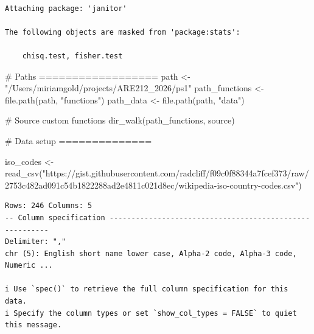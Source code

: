 \documentclass[
  letterpaper,
  DIV=11,
  numbers=noendperiod]{scrartcl}
\newenvironment{Shaded}{\begin{snugshade}}{\end{snugshade}}
\newcommand{\CommentTok}[1]{\textcolor[rgb]{0.37,0.37,0.37}{#1}}
\newcommand{\FunctionTok}[1]{\textcolor[rgb]{0.28,0.35,0.67}{#1}}
\newcommand{\NormalTok}[1]{\textcolor[rgb]{0.00,0.23,0.31}{#1}}
\newcommand{\OtherTok}[1]{\textcolor[rgb]{0.00,0.23,0.31}{#1}}
\newcommand{\StringTok}[1]{\textcolor[rgb]{0.13,0.47,0.30}{#1}}
\begin{document}
\begin{verbatim}

Attaching package: 'janitor'

The following objects are masked from 'package:stats':

    chisq.test, fisher.test
\end{verbatim}

\begin{Shaded}
\begin{Highlighting}[]
\CommentTok{\# Paths ==================}
\NormalTok{path }\OtherTok{\textless{}{-}} \StringTok{"/Users/miriamgold/projects/ARE212\_2026/ps1"}
\NormalTok{path\_functions }\OtherTok{\textless{}{-}} \FunctionTok{file.path}\NormalTok{(path, }\StringTok{"functions"}\NormalTok{)}
\NormalTok{path\_data }\OtherTok{\textless{}{-}} \FunctionTok{file.path}\NormalTok{(path, }\StringTok{"data"}\NormalTok{)}

\CommentTok{\# Source custom functions }
\FunctionTok{dir\_walk}\NormalTok{(path\_functions, source)}

\CommentTok{\# Data setup ==============}

\NormalTok{iso\_codes }\OtherTok{\textless{}{-}} 
  \FunctionTok{read\_csv}\NormalTok{(}\StringTok{"https://gist.githubusercontent.com/radcliff/f09c0f88344a7fcef373/raw/2753c482ad091c54b1822288ad2e4811c021d8ec/wikipedia{-}iso{-}country{-}codes.csv"}\NormalTok{)}
\end{Highlighting}
\end{Shaded}

\begin{verbatim}
Rows: 246 Columns: 5
-- Column specification --------------------------------------------------------
Delimiter: ","
chr (5): English short name lower case, Alpha-2 code, Alpha-3 code, Numeric ...

i Use `spec()` to retrieve the full column specification for this data.
i Specify the column types or set `show_col_types = FALSE` to quiet this message.
\end{verbatim}
\end{document}
